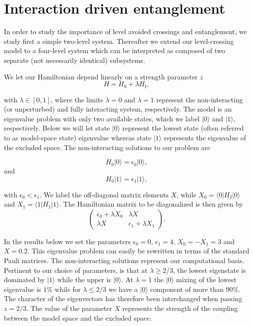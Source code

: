 \documentclass[twocolumn,superscriptaddress,unsortedaddress,
 amsmath,amssymb,
 aps,
]{revtex4-2}
\begin{document}
\section{Interaction driven entanglement}

In order to study the importance of level avoided crossings and
entanglement, we study first a simple two-level system. Thereafter we
extend our level-crossing model to a four-level system which can be
interpreted as composed of two separate (not necessarily identical)
subsystems.

We let our Hamiltonian depend linearly on a strength parameter $z$
\[
       H=H_0+\lambda H_\mathrm{I},
\]

with $\lambda \in [0,1]$, where the limits $\lambda=0$ and $\lambda=1$
represent the non-interacting (or unperturbed) and fully interacting
system, respectively.  The model is an eigenvalue problem with only
two available states, which we label $\vert 0\rangle$ and $\vert
1\rangle$, respectively. Below we will let state $\vert 0 \rangle$
represent the lowest state (often referred to as model-space state)
eigenvalue whereas state $\vert 1\rangle$ represents the eigenvalue of
the excluded space.  The non-interacting solutions to our problem are

\[
       H_0\vert 0 \rangle =\epsilon_0\vert 0 \rangle,
\]
and
\[
       H_0\vert 1\rangle =\epsilon_1\vert 1\rangle,
\]

with $\epsilon_0 < \epsilon_1$. We label the off-diagonal matrix
elements $X$, while $X_0=\langle 0 \vert H_I\vert 0 \rangle$ and
$X_1=\langle 1 \vert H_1\vert 1 \rangle$.  The Hamiltonian matrix to be diagonalized is then given by
\[
\left(\begin{array}{cc}\epsilon_0+\lambda X_0 &\lambda X \\
\lambda X &\epsilon_1+\lambda X_1 \end{array}\right).
\]

In the results below we set the parameters $\epsilon_0=0$,
$\epsilon_1=4$, $X_0=-X_1=3$ and $X=0.2$.  This eigenvalue problem can
easily be rewritten in terms of the standard Pauli matrices.  The
non-interacting solutions represent our computational basis.
Pertinent to our choice of parameters, is that at $\lambda\geq 2/3$,
the lowest eigenstate is dominated by $\vert 1\rangle$ while the upper
is $\vert 0 \rangle$. At $\lambda=1$ the $\vert 0 \rangle$ mixing of
the lowest eigenvalue is $1\%$ while for $\lambda\leq 2/3$ we have a
$\vert 0 \rangle$ component of more than $90\%$.  The character of the
eigenvectors has therefore been interchanged when passing $z=2/3$. The
value of the parameter $X$ represents the strength of the coupling
between the model space and the excluded space.  
\end{document}

